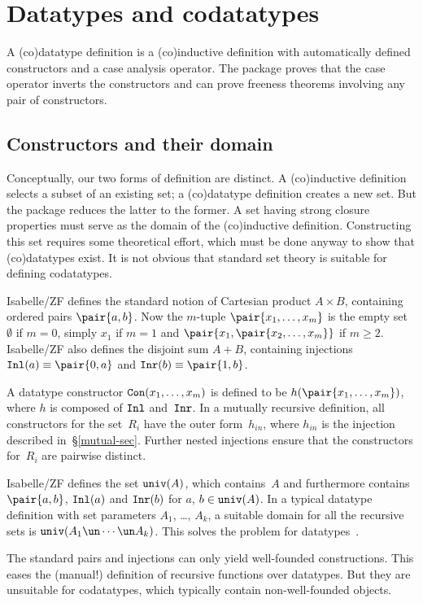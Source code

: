 \section{Datatypes and codatatypes}\label{data-sec}
A (co)datatype definition is a (co)inductive definition with automatically
defined constructors and a case analysis operator.  The package proves that
the case operator inverts the constructors and can prove freeness theorems
involving any pair of constructors.


\subsection{Constructors and their domain}\label{univ-sec}
Conceptually, our two forms of definition are distinct.  A (co)inductive
definition selects a subset of an existing set; a (co)datatype definition
creates a new set.  But the package reduces the latter to the former.  A
set having strong closure properties must serve as the domain of the
(co)inductive definition.  Constructing this set requires some theoretical
effort, which must be done anyway to show that (co)datatypes exist.  It is
not obvious that standard set theory is suitable for defining codatatypes.

Isabelle/ZF defines the standard notion of Cartesian product $A\times B$,
containing ordered pairs $\pair{a,b}$.  Now the $m$-tuple
$\pair{x_1,\ldots,x_m}$ is the empty set~$\emptyset$ if $m=0$, simply
$x_1$ if $m=1$ and $\pair{x_1,\pair{x_2,\ldots,x_m}}$ if $m\geq2$.
Isabelle/ZF also defines the disjoint sum $A+B$, containing injections
$\Inl(a)\equiv\pair{0,a}$ and $\Inr(b)\equiv\pair{1,b}$.

A datatype constructor $\hbox{\tt Con}(x_1,\ldots,x_m)$ is defined to be
$h(\pair{x_1,\ldots,x_m})$, where $h$ is composed of $\hbox{\tt Inl}$ and~$\hbox{\tt Inr}$.
In a mutually recursive definition, all constructors for the set~$R_i$ have
the outer form~$h_{in}$, where $h_{in}$ is the injection described
in~\S\ref{mutual-sec}.  Further nested injections ensure that the
constructors for~$R_i$ are pairwise distinct.  

Isabelle/ZF defines the set $\hbox{\tt univ}(A)$, which contains~$A$ and
furthermore contains $\pair{a,b}$, $\hbox{\tt Inl}(a)$ and $\hbox{\tt Inr}(b)$ for $a$,
$b\in\hbox{\tt univ}(A)$.  In a typical datatype definition with set parameters
$A_1$, \ldots, $A_k$, a suitable domain for all the recursive sets is
$\univ(A_1\un\cdots\un A_k)$.  This solves the problem for
datatypes~\cite[\S4.2]{paulson-set-II}.

The standard pairs and injections can only yield well-founded
constructions.  This eases the (manual!) definition of recursive functions
over datatypes.  But they are unsuitable for codatatypes, which typically
contain non-well-founded objects.

